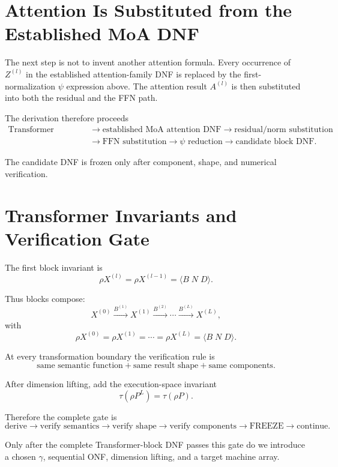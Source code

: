 \documentclass[11pt]{article}
\begin{document}
\section{Attention Is Substituted from the Established MoA DNF}

The next step is not to invent another attention formula.  Every occurrence of \(Z^{(l)}\) in the
established attention-family DNF is replaced by the first-normalization \(\psi\) expression above.
The attention result \(A^{(l)}\) is then substituted into both the residual and the FFN path.

The derivation therefore proceeds
\[
\boxed{\begin{aligned}
\text{Transformer formulation}
&\rightarrow \text{established MoA attention DNF}\rightarrow \text{residual/norm substitution}\\
&\rightarrow \text{FFN substitution}\rightarrow \psi\text{ reduction}\rightarrow \text{candidate block DNF}.
\end{aligned}}
\]

The candidate DNF is frozen only after component, shape, and numerical verification.

\section{Transformer Invariants and Verification Gate}

The first block invariant is
\[
\boxed{
\rho X^{(l)}
=
\rho X^{(l-1)}
=
\langle B\;N\;D\rangle.
}
\]

Thus blocks compose:
\[
X^{(0)}
\xrightarrow{B^{(1)}}
X^{(1)}
\xrightarrow{B^{(2)}}
\cdots
\xrightarrow{B^{(L)}}
X^{(L)},
\]
with
\[
\boxed{
\rho X^{(0)}=\rho X^{(1)}=\cdots=\rho X^{(L)}
=
\langle B\;N\;D\rangle.
}
\]

At every transformation boundary the verification rule is
\[
\boxed{
\text{same semantic function}
+
\text{same result shape}
+
\text{same components}.
}
\]

After dimension lifting, add the execution-space invariant
\[
\boxed{\tau(\rho P^L)=\tau(\rho P).}
\]

Therefore the complete gate is
\[
\boxed{
\text{derive}
\rightarrow
\text{verify semantics}
\rightarrow
\text{verify shape}
\rightarrow
\text{verify components}
\rightarrow
\text{FREEZE}
\rightarrow
\text{continue}.
}
\]

Only after the complete Transformer-block DNF passes this gate do we introduce a chosen
\(\gamma\), sequential ONF, dimension lifting, and a target machine array.
\end{document}
